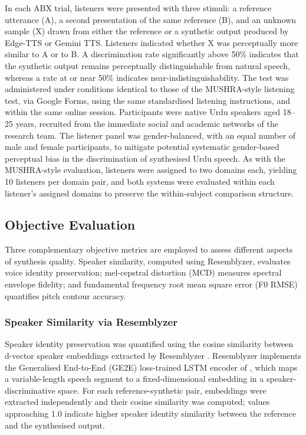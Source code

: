 \documentclass[a4paper,fleqn]{cas-dc}
\begin{document}
    In each ABX trial, listeners were presented with three stimuli: a
    reference utterance (A), a second presentation of the same reference
    (B), and an unknown sample (X) drawn from either the reference or a
    synthetic output produced by Edge-TTS or Gemini TTS. Listeners
    indicated whether X was perceptually more similar to A or to B. A
    discrimination rate significantly above 50\% indicates that the
    synthetic output remains perceptually distinguishable from natural
    speech, whereas a rate at or near 50\% indicates
    near-indistinguishability. The test was administered under conditions
    identical to those of the MUSHRA-style listening test, via Google
    Forms, using the same standardised listening instructions, and within
    the same online session. Participants were native Urdu speakers aged
    18--25 years, recruited from the immediate social and academic
    networks of the research team. The listener panel was gender-balanced,
    with an equal number of male and female participants, to mitigate
    potential systematic gender-based perceptual bias in the
    discrimination of synthesised Urdu speech. As with the MUSHRA-style
    evaluation, listeners were assigned to two domains each, yielding
    10 listeners per domain pair, and both systems were evaluated within
    each listener's assigned domains to preserve the within-subject
    comparison structure.
    
    \subsection{Objective Evaluation}\label{sec:methodology-objective}

    Three complementary objective metrics are employed to assess different aspects of synthesis quality. Speaker similarity, computed using Resemblyzer, evaluates voice identity preservation; mel-cepstral distortion (MCD) measures spectral envelope fidelity; and fundamental frequency root mean square error (F0 RMSE) quantifies pitch contour accuracy.

    \subsubsection{Speaker Similarity via Resemblyzer}\label{sec:methodology-speaker}
    
    Speaker identity preservation was quantified using the cosine similarity
    between d-vector speaker embeddings extracted by Resemblyzer
    \citep{wan2018ge2e}. Resemblyzer implements the Generalised End-to-End
    (GE2E) loss-trained LSTM encoder of \citet{wan2018ge2e}, which maps a
    variable-length speech segment to a fixed-dimensional embedding in a
    speaker-discriminative space. For each reference-synthetic pair,
    embeddings were extracted independently and their cosine similarity
    was computed; values approaching 1.0 indicate higher speaker identity
    similarity between the reference and the synthesised output.
    
\end{document}
